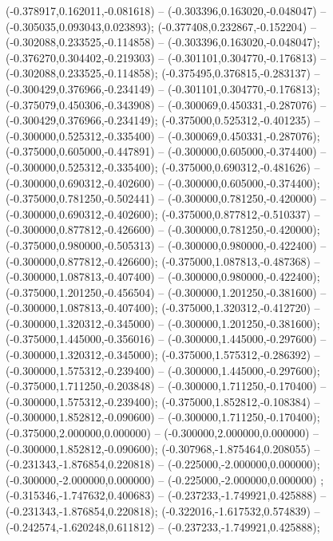  (-0.378917,0.162011,-0.081618) -- (-0.303396,0.163020,-0.048047) -- (-0.305035,0.093043,0.023893);
 (-0.377408,0.232867,-0.152204) -- (-0.302088,0.233525,-0.114858) -- (-0.303396,0.163020,-0.048047);
 (-0.376270,0.304402,-0.219303) -- (-0.301101,0.304770,-0.176813) -- (-0.302088,0.233525,-0.114858);
 (-0.375495,0.376815,-0.283137) -- (-0.300429,0.376966,-0.234149) -- (-0.301101,0.304770,-0.176813);
 (-0.375079,0.450306,-0.343908) -- (-0.300069,0.450331,-0.287076) -- (-0.300429,0.376966,-0.234149);
 (-0.375000,0.525312,-0.401235) -- (-0.300000,0.525312,-0.335400) -- (-0.300069,0.450331,-0.287076);
 (-0.375000,0.605000,-0.447891) -- (-0.300000,0.605000,-0.374400) -- (-0.300000,0.525312,-0.335400);
 (-0.375000,0.690312,-0.481626) -- (-0.300000,0.690312,-0.402600) -- (-0.300000,0.605000,-0.374400);
 (-0.375000,0.781250,-0.502441) -- (-0.300000,0.781250,-0.420000) -- (-0.300000,0.690312,-0.402600);
 (-0.375000,0.877812,-0.510337) -- (-0.300000,0.877812,-0.426600) -- (-0.300000,0.781250,-0.420000);
 (-0.375000,0.980000,-0.505313) -- (-0.300000,0.980000,-0.422400) -- (-0.300000,0.877812,-0.426600);
 (-0.375000,1.087813,-0.487368) -- (-0.300000,1.087813,-0.407400) -- (-0.300000,0.980000,-0.422400);
 (-0.375000,1.201250,-0.456504) -- (-0.300000,1.201250,-0.381600) -- (-0.300000,1.087813,-0.407400);
 (-0.375000,1.320312,-0.412720) -- (-0.300000,1.320312,-0.345000) -- (-0.300000,1.201250,-0.381600);
 (-0.375000,1.445000,-0.356016) -- (-0.300000,1.445000,-0.297600) -- (-0.300000,1.320312,-0.345000);
 (-0.375000,1.575312,-0.286392) -- (-0.300000,1.575312,-0.239400) -- (-0.300000,1.445000,-0.297600);
 (-0.375000,1.711250,-0.203848) -- (-0.300000,1.711250,-0.170400) -- (-0.300000,1.575312,-0.239400);
 (-0.375000,1.852812,-0.108384) -- (-0.300000,1.852812,-0.090600) -- (-0.300000,1.711250,-0.170400);
 (-0.375000,2.000000,0.000000) -- (-0.300000,2.000000,0.000000) -- (-0.300000,1.852812,-0.090600);
 (-0.307968,-1.875464,0.208055) -- (-0.231343,-1.876854,0.220818) -- (-0.225000,-2.000000,0.000000);
 (-0.300000,-2.000000,0.000000) -- (-0.225000,-2.000000,0.000000) ;
 (-0.315346,-1.747632,0.400683) -- (-0.237233,-1.749921,0.425888) -- (-0.231343,-1.876854,0.220818);
 (-0.322016,-1.617532,0.574839) -- (-0.242574,-1.620248,0.611812) -- (-0.237233,-1.749921,0.425888);
